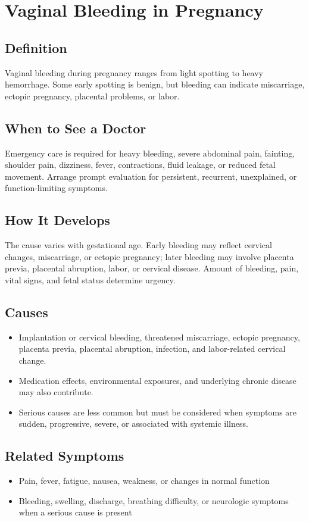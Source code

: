 \chapter{Vaginal Bleeding in Pregnancy}

\section*{Definition}
Vaginal bleeding during pregnancy ranges from light spotting to heavy hemorrhage. Some early spotting is benign, but bleeding can indicate miscarriage, ectopic pregnancy, placental problems, or labor.

\section*{When to See a Doctor}
Emergency care is required for heavy bleeding, severe abdominal pain, fainting, shoulder pain, dizziness, fever, contractions, fluid leakage, or reduced fetal movement. Arrange prompt evaluation for persistent, recurrent, unexplained, or function-limiting symptoms.

\section*{How It Develops}
The cause varies with gestational age. Early bleeding may reflect cervical changes, miscarriage, or ectopic pregnancy; later bleeding may involve placenta previa, placental abruption, labor, or cervical disease. Amount of bleeding, pain, vital signs, and fetal status determine urgency.

\section*{Causes}
\begin{itemize}
  \item Implantation or cervical bleeding, threatened miscarriage, ectopic pregnancy, placenta previa, placental abruption, infection, and labor-related cervical change.
  \item Medication effects, environmental exposures, and underlying chronic disease may also contribute.
  \item Serious causes are less common but must be considered when symptoms are sudden, progressive, severe, or associated with systemic illness.
\end{itemize}

\section*{Related Symptoms}
\begin{itemize}
  \item Pain, fever, fatigue, nausea, weakness, or changes in normal function
  \item Bleeding, swelling, discharge, breathing difficulty, or neurologic symptoms when a serious cause is present
\end{itemize}

